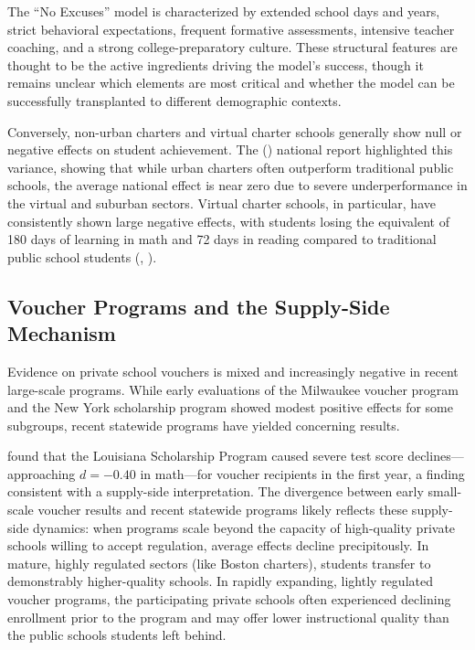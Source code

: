 \documentclass[12pt,letterpaper]{article}
\begin{document}
The ``No Excuses'' model is characterized by extended school days and years, strict behavioral expectations, frequent formative assessments, intensive teacher coaching, and a strong college-preparatory culture. These structural features are thought to be the active ingredients driving the model's success, though it remains unclear which elements are most critical and whether the model can be successfully transplanted to different demographic contexts.

Conversely, non-urban charters and virtual charter schools generally show null or negative effects on student achievement. The  (\citeyear{credostanford2015}) national report highlighted this variance, showing that while urban charters often outperform traditional public schools, the average national effect is near zero due to severe underperformance in the virtual and suburban sectors. Virtual charter schools, in particular, have consistently shown large negative effects, with students losing the equivalent of 180 days of learning in math and 72 days in reading compared to traditional public school students (, \citeyear{credostanford2015}).

\subsection{Voucher Programs and the Supply-Side Mechanism}

Evidence on private school vouchers is mixed and increasingly negative in recent large-scale programs. While early evaluations of the Milwaukee voucher program \citep{rouse1998} and the New York scholarship program \citep{howell2002} showed modest positive effects for some subgroups, recent statewide programs have yielded concerning results.

\citet{abdulkadirolu2018} found that the Louisiana Scholarship Program caused severe test score declines---approaching $d = -0.40$ in math---for voucher recipients in the first year, a finding consistent with a supply-side interpretation. The divergence between early small-scale voucher results and recent statewide programs likely reflects these supply-side dynamics: when programs scale beyond the capacity of high-quality private schools willing to accept regulation, average effects decline precipitously. In mature, highly regulated sectors (like Boston charters), students transfer to demonstrably higher-quality schools. In rapidly expanding, lightly regulated voucher programs, the participating private schools often experienced declining enrollment prior to the program and may offer lower instructional quality than the public schools students left behind.
\end{document}

